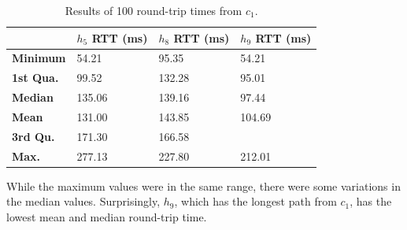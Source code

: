 \begin{table}
  \centering
  \begin{tabular}{|l|l|l|l|}
    \hline
      \textbf{} &
      \textbf{$h_5$ RTT (ms)} &
      \textbf{$h_8$ RTT (ms)} &
      \textbf{$h_9$ RTT (ms)}
      \\

    \hline \textbf{Minimum} & 54.21 & 95.35 & 54.21 \\
    \hline \textbf{1st Qua.} & 99.52 & 132.28 & 95.01 \\
    \hline \textbf{Median} & 135.06 & 139.16 & 97.44 \\
    \hline \textbf{Mean} & 131.00 & 143.85 & 104.69 \\
    \hline \textbf{3rd Qu.} & 171.30 & 166.58 \\
    \hline \textbf{Max.} & 277.13 & 227.80 & 212.01 \\
    \hline
  \end{tabular}
  \caption{Results of 100 round-trip times from $c_1$.}
  \label{table:paxos.ctrl.results}
\end{table}

While the maximum values were in the same range, there were some variations in
the median values.  Surprisingly, $h_9$, which has the longest path from $c_1$,
has the lowest mean and median round-trip time.


